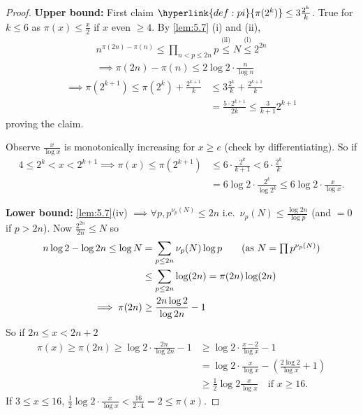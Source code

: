 \documentclass{article}
\begin{document}
\begin{proof}
    \textbf{Upper bound:} First claim $\hyperlink{def:pi}{\pi(2^k)} \leq 3 \frac{2^k}{k}$.
    True for $k \leq 6$ as $\pi(x) \leq \frac{x}{2}$ if $x$ even $\geq 4$.
    By \cref{lem:5.7} (i) and (ii),
    \begin{gather*}
        n^{\pi(2n) - \pi(n)} \leq \prod_{n < p \leq 2n} p \overset{\text{(ii)}}{\leq} N \overset{\text{(i)}}{\leq} 2^{2n} \\
        \implies \pi(2n) - \pi(n) \leq 2 \log 2 \cdot \frac{n}{\log n}
    \end{gather*}
    \begin{align*}
        \implies \pi(2^{k+1}) \leq \pi(2^k) + \frac{2^{k+1}}{k} &\leq 3 \frac{2^k}{k} + \frac{2^{k+1}}{k} \tag{induction on $k$} \\
                                                                &= \frac{5 \cdot 2^{k+1}}{2k} \leq \frac{3}{k+1} 2^{k+1} \tag{$k \geq 5$}
    \end{align*}
    proving the claim.

    Observe $\frac{x}{\log x}$ is monotonically increasing for $x \geq e$ (check by differentiating).
    So if
    \begin{align*}
        4 \leq 2^k < x < 2^{k+1} \implies \pi(x) \leq \pi(2^{k+1}) &\leq 6 \cdot \frac{2^k}{k+1} < 6 \cdot \frac{2^k}{k} \\
                                                                   &= 6 \log 2 \cdot \frac{2^k}{\log 2^k} \leq 6 \log 2 \cdot \frac{x}{\log x}.
    \end{align*}

    \textbf{Lower bound:} \cref{lem:5.7}(iv) $\implies \forall p, p^{\nu_p(N)} \leq 2n$ i.e.\ $\nu_p(N) \leq \frac{\log 2n}{\log p}$ (and $=0$ if $p>2n$).
    Now $\frac{2^{2n}}{2n} \leq N$ so
    \begin{align*}
        n \log 2 - \log 2n \leq \log N &= \sum_{p \leq 2n} \nu_p(N) \log p \tag{as $N = \prod p^{\nu_p(N)}$} \\
                                       &\leq \sum_{p \leq 2n} \log(2n) = \pi(2n) \log(2n) \\
        \implies \pi(2n) &\geq \frac{2n \log 2}{\log 2n} - 1
    \end{align*}
    So if $2n \leq x < 2n+2$
    \begin{align*}
        \pi(x) \geq \pi(2n) \geq \log 2 \cdot \frac{2n}{\log 2n} - 1 &\geq \log 2 \cdot \frac{x-2}{\log x} - 1 \\
                                                                     &= \log 2 \cdot \frac{x}{\log x} - \left(\frac{2\log 2}{\log x} + 1\right) \\
                                                                     &\geq \frac{1}{2} \log 2 \frac{x}{\log x} \quad \text{if } x \geq 16.
    \end{align*}
    If $3 \leq x \leq 16$, $\frac{1}{2} \log 2 \cdot \frac{x}{\log x} < \frac{16}{2 \cdot 4} = 2 \leq \pi(x)$. \qedhere
\end{proof}
\end{document}
